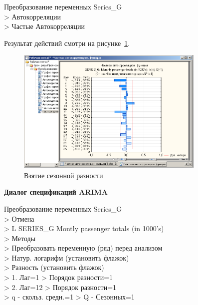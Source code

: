 \newpage

Преобразование переменных Series\_G\\
> Автокорреляции\\
> Частые Автокорреляции

Результат действий смотри на рисунке~\ref{fig:10}.

\begin{figure}[!h]
  \centering

  \includegraphics[height=6cm]
  {inc/10.PNG}

  \caption{Взятие сезонной разности}

  \label{fig:10}
\end{figure}



\begin{center}
  \textbf{Диалог спецификаций ARIMA}
\end{center}

Преобразование переменных Series\_G\\
> Отмена\\
> L SERIES\_G Montly passenger totals (in 1000's)\\
> Методы\\
> Преобразовать переменную (ряд) перед анализом\\
> Натур. логарифм (установить флажок)\\
> Разность (установить флажок)\\
> 1. Лаг=1 > Порядок разности=1\\
> 2. Лаг=12 > Порядок разности=1\\
> q - скольз. средн.=1 > Q - Сезонных=1

